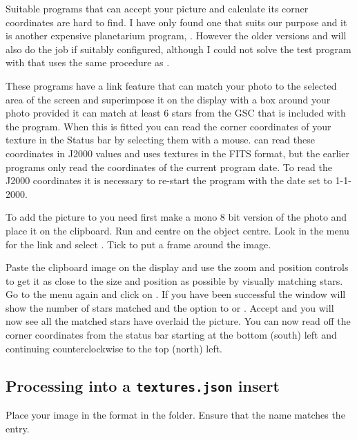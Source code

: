 Suitable programs that can accept your picture and calculate its corner
coordinates are hard to find. I have only found one that suits our
purpose and it is another expensive planetarium program, .
However the older versions  and  will also do the job if
suitably configured, although I could not solve the test program with 
 that uses the same procedure as .

These programs have a link feature that can match your photo to the
selected area of the screen and superimpose it on the display with a box
around your photo provided it can match at least 6 stars from the GSC
that is included with the program. When this is fitted you can read the
corner coordinates of your texture in the Status bar by selecting them
with a mouse.  can read these coordinates in J2000 values and
uses textures in the FITS format, but the earlier programs only read the
coordinates of the current program date. To read the J2000 coordinates
it is necessary to re-start the program with the date set to 1-1-2000.

To add the picture to  you need first make a mono 8 bit version
of the photo and place it on the clipboard. Run  and centre on the
object centre. Look in the  menu for the  link and select
. Tick  to put a frame around the image.

Paste the clipboard image on the display and use the zoom and position
controls to get it as close to the size and position as possible by
visually matching stars. Go to the menu again and click on .
If you have been successful the window will show the number of stars
matched and the option to  or . Accept and you will now
see all the matched stars have overlaid the picture. You can now read
off the corner coordinates from the status bar starting at the bottom
(south) left and continuing counterclockwise to the top (north) left.

\subsection{Processing into a \texorpdfstring{\texttt{textures.json} insert}{textures.json insert}}%

Place your image in the  format in the
 folder. Ensure that the name matches the
 entry.

